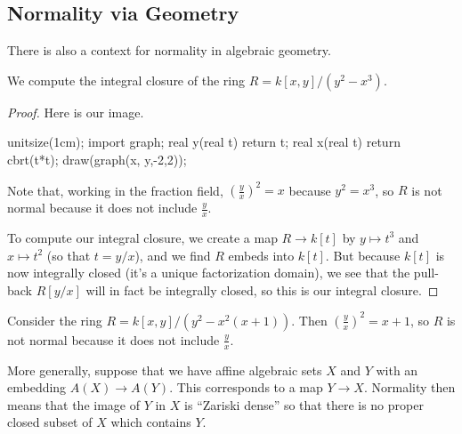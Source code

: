 \subsection{Normality via Geometry}
There is also a context for normality in algebraic geometry.
\begin{exe}
	We compute the integral closure of the ring $R=k[x,y]/\left(y^2-x^3\right)$.
\end{exe}
\begin{proof}
	Here is our image.
	\begin{center}
		\begin{asy}
			unitsize(1cm);
			import graph;
			real y(real t)
			{
				return t;
			}
			real x(real t)
			{
				return cbrt(t*t);
			}
			draw(graph(x, y,-2,2));
		\end{asy}
	\end{center}
	Note that, working in the fraction field, $\left(\frac yx\right)^2=x$ because $y^2=x^3$, so $R$ is not normal because it does not include $\frac yx$.

	To compute our integral closure, we create a map $R\to k[t]$ by $y\mapsto t^3$ and $x\mapsto t^2$ (so that $t=y/x$), and we find $R$ embeds into $k[t]$. But because $k[t]$ is now integrally closed (it's a unique factorization domain), we see that the pull-back $R[y/x]$ will in fact be integrally closed, so this is our integral closure.
\end{proof}
\begin{example}
	Consider the ring $R=k[x,y]/\left(y^2-x^2(x+1)\right)$. Then $\left(\frac yx\right)^2=x+1$, so $R$ is not normal because it does not include $\frac yx$.
\end{example}
More generally, suppose that we have affine algebraic sets $X$ and $Y$ with an embedding $A(X)\to A(Y)$. This corresponds to a map $Y\to X$. Normality then means that the image of $Y$ in $X$ is ``Zariski dense'' so that there is no proper closed subset of $X$ which contains $Y$.

